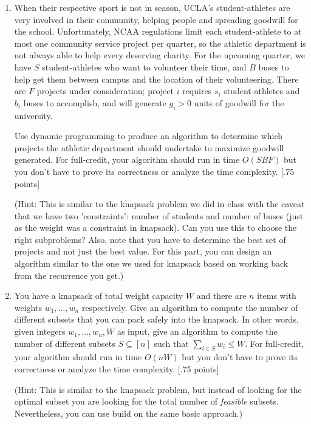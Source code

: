 \documentclass[11pt]{article}
\begin{document}
\begin{enumerate}
\item When their respective sport is not in season, UCLA's student-athletes are very involved in their community, helping people and spreading goodwill for the school. Unfortunately, NCAA regulations limit each student-athlete to at most one community service project per quarter, so the athletic department is not always able to help every deserving charity. For the upcoming quarter, we have $S$ student-athletes who want to volunteer their time, and $B$ buses to help get them between campus and the location of their volunteering. There are $F$ projects under consideration; project $i$ requires $s_i$ student-athletes and $b_i$ buses to accomplish, and will generate $g_i > 0$ units of goodwill for the university.

Use dynamic programming to produce an algorithm to determine which projects the athletic department should undertake to maximize goodwill generated.  For full-credit, your algorithm should run in time $O(S B F)$ but you don't have to prove its correctness or analyze the time complexity. {\color{blue} [.75 points]}

(Hint: This is similar to the knapsack problem we did in class with the caveat that we have two 'constraints': number of students and number of buses (just as the weight was a constraint in knapsack). Can you use this to choose the right subproblems? Also, note that you have to determine the best set of projects and not just the best value. For this part, you can design an algorithm similar to the one we used for knapsack based on working back from the recurrence you get.)

\item You have a knapsack of total weight capacity $W$ and there are $n$ items with weights $w_1,\ldots,w_n$ respectively.  Give an algorithm to compute the number of different subsets that you can pack safely into the knapsack. In other words, given integers $w_1, \ldots, w_n, W$ as input, give an algorithm to compute the number of different subsets $S \subseteq [n]$ such that $\sum_{i \in S} w_i \leq W$.  For full-credit, your algorithm should run in time $O(nW)$ but you don't have to prove its correctness or analyze the time complexity. {\color{blue} [.75 points]}

(Hint: This is similar to the knapsack problem, but instead of looking for the optimal subset you are looking for the total number of \emph{feasible} subsets. Nevertheless, you can use build on the same basic approach.)



\end{enumerate}
\end{document}
